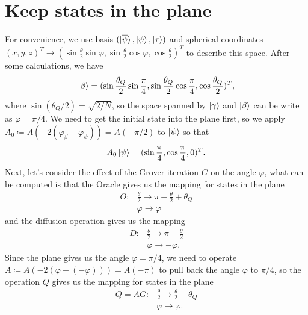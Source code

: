 \documentclass[a4paper,10pt]{book}
\numberwithin{equation}{section}
\begin{document}
\section{Keep states in the plane}

For convenience, we use basis $(\ket{\overline{\psi}},\ket{\psi},\ket{\tau})$ and spherical coordinates $(x,y,z)^{T}\to(\sin\frac{\theta}{2}\sin\varphi,\sin\frac{\theta}{2}\cos\varphi,\cos\frac{\theta}{2})^{T}$ to describe this space. After some calculations, we have
\begin{equation}
    \ket{\beta}=(\sin\frac{\theta_{Q}}{2}\sin\frac{\pi}{4},\sin\frac{\theta_{Q}}{2}\cos\frac{\pi}{4},\cos\frac{\theta_{Q}}{2})^{T},
\end{equation}
where $\sin(\theta_{Q}/2)=\sqrt{2/N}$, so the space spanned by $\ket{\gamma}$ and $\ket{\beta}$ can be write as $\varphi=\pi/4$. We need to get the initial state into the plane first, so we apply $A_{0}\coloneqq A(-2(\varphi_{\beta}-\varphi_{\psi}))=A(-\pi/2)$ to $\ket{\psi}$ so that
\begin{equation}
    A_{0}\ket{\psi}=(\sin\frac{\pi}{4},\cos\frac{\pi}{4},0)^{T}.
\end{equation}
Next, let's consider the effect of the Grover iteration $G$ on the angle $\varphi$, what can be computed is that the Oracle gives us the mapping for states in the plane
\begin{equation}
    \begin{split}
        O\colon & \frac{\theta}{2}\to\pi-\frac{\theta}{2}+\theta_{Q} \\
                & \varphi\to\varphi
    \end{split}
\end{equation}
and the diffusion operation gives us the mapping
\begin{equation}
    \begin{split}
        D\colon & \frac{\theta}{2}\to\pi-\frac{\theta}{2} \\
                & \varphi\to-\varphi.
    \end{split}
\end{equation}
Since the plane gives us the angle $\varphi=\pi/4$, we need to operate $A\coloneqq A(-2(\varphi-(-\varphi)))=A(-\pi)$ to pull back the angle $\varphi$ to $\pi/4$, so the operation $Q$ gives us the mapping for states in the plane
\begin{equation}
    \begin{split}
        Q=AG\colon & \frac{\theta}{2}\to\frac{\theta}{2}-\theta_{Q} \\
                   & \varphi\to\varphi.
    \end{split}
\end{equation}
\end{document}

